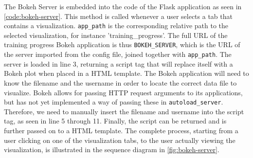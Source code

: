 \noindent The Bokeh Server is embedded into the code of the Flask application as seen in \autoref{code:bokeh-server}. This method is called whenever a user selects a tab that contains a visualization. \texttt{app\_path} is the corresponding relative path to the selected visualization, for instance 'training\_progress'. The full URL of the training progress Bokeh application is thus \texttt{BOKEH\_SERVER}, which is the URL of the server imported from the config file, joined together with \texttt{app\_path}. The server is loaded in line 3, returning a script tag that will replace itself with a Bokeh plot when placed in a HTML template. The Bokeh application will need to know the filename and the username in order to locate the correct data file to visualize. Bokeh allows for passing HTTP request arguments to its applications, but has not yet implemented a way of passing these in \texttt{autoload\_server}. Therefore, we need to manually insert the filename and username into the script tag, as seen in line 5 through 11. Finally, the script can be returned and is further passed on to a HTML template. The complete process, starting from a user clicking on one of the visualization tabs, to the user actually viewing the visualization, is illustrated in the sequence diagram in \autoref{fig:bokeh-server}.



